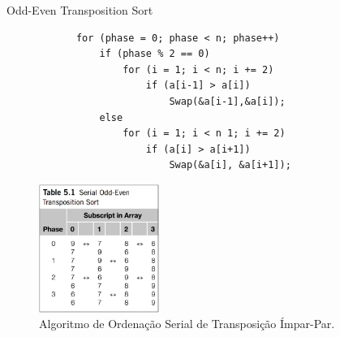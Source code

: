 	\begin{frame}[fragile]{Odd-Even Transposition Sort }
		\begin{multicols}{2}
			\begin{verbatim}
			for (phase = 0; phase < n; phase++) 
				if (phase % 2 == 0)
					for (i = 1; i < n; i += 2)
						if (a[i-1] > a[i]) 
							Swap(&a[i-1],&a[i]); 
				else
					for (i = 1; i < n 1; i += 2)
						if (a[i] > a[i+1]) 
							Swap(&a[i], &a[i+1]);
			\end{verbatim}
		\columnbreak
			\begin{figure}[p]
				\centering
				\includegraphics[width=0.35\textwidth]{img/pacheco/odd-even.png}
				\caption{Algoritmo de Ordenação Serial de Transposição Ímpar-Par.}
			\end{figure}
		\end{multicols}
\end{frame}

